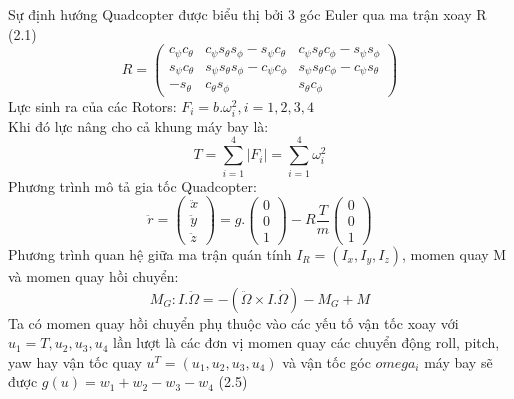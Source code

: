 		Sự định hướng Quadcopter được biểu thị bởi 3 góc Euler qua ma trận xoay R (2.1)
        \\
        \begin{equation}
        R=\begin{pmatrix}
c_{\psi}c_{\theta } & c_{\psi}s_{\theta }s_{\phi}-s_{\psi }c_{\theta } & c_{\psi}s_{\theta }c_{\phi}-s_{\psi }s_{\phi }\\ 
s_{\psi}c_{\theta } & s_{\psi}s_{\theta }s_{\phi}-c_{\psi }c_{\phi } & s_{\psi}s_{\theta }c_{\phi}-c_{\psi }s_{\theta }\\ 
-s_{\theta} & c_{\theta }s_{\phi} & s_{\theta }c_{\phi}
\end{pmatrix}
		\end{equation}
        Lực sinh ra của các Rotors: $F_i = b.\omega_i^2, i = 1, 2, 3, 4$ \\
       Khi đó lực nâng cho cả khung máy bay là:
        \begin{equation}
	        	T=\sum_{i=1}^{4}\left | F_{i} \right |=\sum_{i=1}^{4}\omega_{i}^{2}
        \end{equation}
        Phương trình mô tả gia tốc Quadcopter:
        \\
        \begin{equation}
        \ddot{r}=\begin{pmatrix}
\ddot{x}\\ 
\ddot{y}\\ 
\ddot{z}
\end{pmatrix}=g.\begin{pmatrix}
0\\ 
0\\ 
1
\end{pmatrix}-R\frac{T}{m}\begin{pmatrix}
0\\ 
0\\ 
1
\end{pmatrix}
        \end{equation}
        Phương trình quan hệ giữa ma trận quán tính $I_R = (I_x, I_y, I_z)$, momen quay M và momen quay hồi chuyển:
        \begin{equation}
        M_{G}:I.\ddot{\Omega}=-(\ddot{\Omega}\times I.\dot{\Omega})-M_{G}+M
        \end{equation}
        Ta có momen quay hồi chuyển phụ thuộc vào các yếu tố vận tốc xoay với $u_1 = T, u_2, u_3, u_4$ lần lượt là các đơn vị momen quay các chuyển động roll, pitch, yaw hay vận tốc quay $u^T=(u_1, u_2, u_3, u_4)$ và vận tốc góc $omega_i$ máy bay sẽ được $g(u) = w_1 + w_2 - w_3 - w_4$ (2.5)

